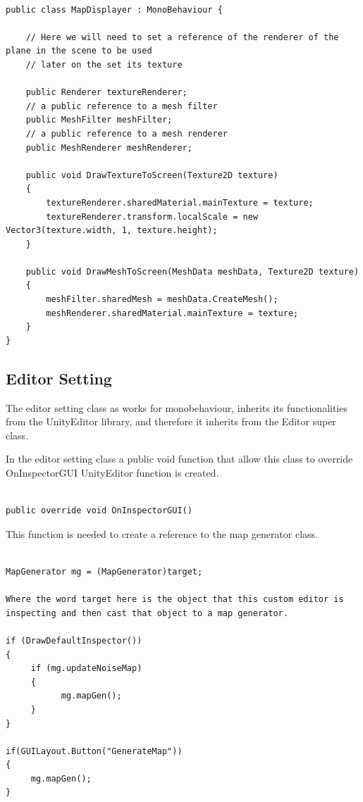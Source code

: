 \documentclass[a4paper,12pt]{book}
\begin{document}
\begin{lstlisting}

public class MapDisplayer : MonoBehaviour {

    // Here we will need to set a reference of the renderer of the plane in the scene to be used
    // later on the set its texture

    public Renderer textureRenderer;
    // a public reference to a mesh filter
    public MeshFilter meshFilter;
    // a public reference to a mesh renderer
    public MeshRenderer meshRenderer;

    public void DrawTextureToScreen(Texture2D texture)
    {
        textureRenderer.sharedMaterial.mainTexture = texture;
        textureRenderer.transform.localScale = new Vector3(texture.width, 1, texture.height);
    }

    public void DrawMeshToScreen(MeshData meshData, Texture2D texture)
    {
        meshFilter.sharedMesh = meshData.CreateMesh();
        meshRenderer.sharedMaterial.mainTexture = texture;
    }
}

\end{lstlisting}

\subsection{Editor Setting}

The editor setting class as works for monobehaviour, inherits its functionalities from the UnityEditor library, and therefore it inherits from the Editor super class.

In the editor setting class a public void function that allow this class to override OnInspectorGUI UnityEditor function is created.

\begin{lstlisting}

public override void OnInspectorGUI()

\end{lstlisting}


This function is needed to create a reference to the map generator class.


\begin{lstlisting}

MapGenerator mg = (MapGenerator)target;

Where the word target here is the object that this custom editor is inspecting and then cast that object to a map generator.

if (DrawDefaultInspector())
{
     if (mg.updateNoiseMap)
     {
           mg.mapGen();
     }
}

if(GUILayout.Button("GenerateMap"))
{
     mg.mapGen();
}

\end{lstlisting}
\end{document}
